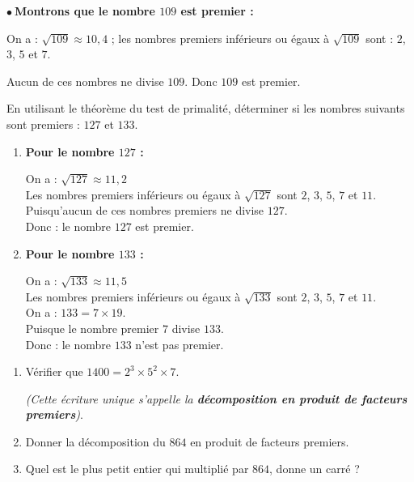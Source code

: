 \documentclass[10pt, a4paper]{article}
\begin{document}
\begin{Exemple}[][5 min]
$\bullet~$\textbf{Montrons que le nombre $109$ est premier :}

On a : $\sqrt{109} \approx 10,4$ ;
les nombres premiers inférieurs ou égaux à $\sqrt{109}$ sont : $2$, $3$, $5$ et $7$.

Aucun de ces nombres ne divise $109$. Donc $109$ est premier.
\end{Exemple}


\begin{Application}[][15 min]
  En utilisant le théorème du test de primalité, déterminer si les nombres suivants sont premiers : $127$ et $133$.

\end{Application}

\begin{Solution}[APPLICATION][8]
\begin{enumerate}[leftmargin=*,itemsep=0.5pt]
    \item \textbf{Pour le nombre $127$ :}
    
    On a : $\sqrt{127} \approx 11,2$ \\
    Les nombres premiers inférieurs ou égaux à $\sqrt{127}$ sont $2$, $3$, $5$, $7$ et $11$. \\
    Puisqu'aucun de ces nombres premiers ne divise $127$. \\
    Donc : \quad le nombre $127$ est premier.
    
    \item \textbf{Pour le nombre $133$ :}
    
    On a : $\sqrt{133} \approx 11,5$ \\
    Les nombres premiers inférieurs ou égaux à $\sqrt{133}$ sont $2$, $3$, $5$, $7$ et $11$. \\
    On a : $133 = 7 \times 19$. \\
    Puisque le nombre premier $7$ divise $133$. \\
    Donc : \quad le nombre $133$ n'est pas premier.
\end{enumerate}
\end{Solution}


\begin{Activite}[][10 min]
\begin{enumerate}[leftmargin=*,itemsep=0.5pt]
   \item Vérifier que $1400 = 2^3 \times 5^2 \times 7 $. 
   
   \textit{(Cette écriture unique s'appelle la \textbf{décomposition en produit de facteurs premiers})}.
    \item Donner la décomposition du $864$ en produit de facteurs premiers.
    \item Quel est le plus petit entier qui multiplié par $864$, donne un carré ?
\end{enumerate}
\end{Activite}
\end{document}
